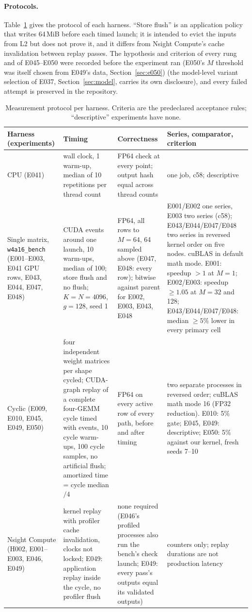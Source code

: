 \documentclass[sigconf,nonacm]{acmart}
\begin{document}
\paragraph{Protocols.} Table~\ref{tab:protocol} gives the protocol of each harness. ``Store flush'' is an application policy that writes 64\,MiB before each timed launch; it is intended to evict the inputs from L2 but does not prove it, and it differs from Nsight Compute's cache invalidation between replay passes. The hypothesis and criterion of every rung and of E045--E050 were recorded before the experiment ran (E050's $M$ threshold was itself chosen from E049's data, Section~\ref{sec:e050}) (the model-level variant selection of E037, Section~\ref{sec:model}, carries its own disclosure), and every failed attempt is preserved in the repository.

\begin{table}[t]
\caption{Measurement protocol per harness. Criteria are the predeclared acceptance rules; ``descriptive'' experiments have none.}
\label{tab:protocol}
\small
\begin{tabular}{p{}p{}p{}p{}}
\toprule
Harness (experiments) & Timing & Correctness & Series, comparator, criterion \\
\midrule
CPU (E041) & wall clock, 1 warm-up, median of 10 repetitions per thread count & FP64 check at every point; output hash equal across thread counts & one job, c58; descriptive \\
Single matrix, \texttt{w4a16\_bench} (E001--E003, E041 GPU rows, E043, E044, E047, E048) & CUDA events around one launch, 10 warm-ups, median of 100; store flush and no flush; $K=N=4096$, $g=128$, seed 1 & FP64, all rows to $M=64$, 64 sampled above (E047, E048: every row); bitwise against parent for E002, E003, E043, E048 & E001/E002 one series, E003 two series (c58); E043/E044/E047/E048 two series in reversed kernel order on five nodes. cuBLAS in default math mode. E001: speedup $>1$ at $M=1$; E002/E003: speedup $\ge 1.05$ at $M=32$ and 128; E043/E044/E047/E048: median $\ge 5\%$ lower in every primary cell \\
Cyclic (E009, E010, E045, E049, E050) & four independent weight matrices per shape cycled; CUDA-graph replay of a complete four-GEMM cycle timed with events, 10 cycle warm-ups, 100 cycle samples, no artificial flush; amortized time = cycle median$/4$ & FP64 on every active row of every path, before and after timing & two separate processes in reversed order; cuBLAS math mode 16 (FP32 reduction). E010: 5\% gate; E045, E049: descriptive; E050: 5\% against our kernel, fresh seeds 7--10 \\
Nsight Compute (H002, E001--E003, E046, E049) & kernel replay with profiler cache invalidation, clocks not locked; E049: application replay inside the cycle, no profiler flush & none required (E046's profiled processes also run the bench's check launch; E049: every pass's outputs equal its validated outputs) & counters only; replay durations are not production latency \\
\bottomrule
\end{tabular}
\end{table}
\end{document}
